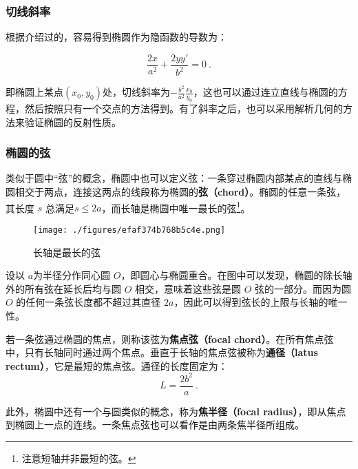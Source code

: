 \subsubsection{切线斜率}

根据介绍过的，容易得到椭圆作为隐函数的导数为：

\begin{equation}
\frac{2x}{a^2} + \frac{2yy'}{b^2} = 0~.
\end{equation}

即椭圆上某点$(x_0,y_0)$处，切线斜率为$\displaystyle-\frac{b^2}{a^2}\frac{x_0}{y_0}$，这也可以通过连立直线与椭圆的方程，然后按照只有一个交点的方法得到。有了斜率之后，也可以采用解析几何的方法来验证椭圆的反射性质。

\subsubsection{椭圆的弦}

类似于圆中“弦”的概念，椭圆中也可以定义弦：一条穿过椭圆内部某点的直线与椭圆相交于两点，连接这两点的线段称为椭圆的\textbf{弦（chord）}。椭圆的任意一条弦，其长度 $s$ 总满足$s\leq2a$，而长轴是椭圆中唯一最长的弦\footnote{注意短轴并非最短的弦。}。
\begin{figure}[ht]
\centering
\texttt{[image: ./figures/efaf374b768b5c4e.png]}
\caption{长轴是最长的弦} \label{fig_Elips3_4}
\end{figure}
设以 $a$为半径分作同心圆 $O$，即圆心与椭圆重合。在图中可以发现，椭圆的除长轴外的所有弦在延长后均与圆 $O$ 相交，意味着这些弦是圆 $O$ 弦的一部分。而因为圆 $O$ 的任何一条弦长度都不超过其直径 $2a$，因此可以得到弦长的上限与长轴的唯一性。

若一条弦通过椭圆的焦点，则称该弦为\textbf{焦点弦（focal chord）}。在所有焦点弦中，只有长轴同时通过两个焦点。垂直于长轴的焦点弦被称为\textbf{通径（latus rectum）}，它是最短的焦点弦。通径的长度固定为：
\begin{equation}
L = \frac{2b^2}{a}~.
\end{equation}

此外，椭圆中还有一个与圆类似的概念，称为\textbf{焦半径（focal radius）}，即从焦点到椭圆上一点的连线。一条焦点弦也可以看作是由两条焦半径所组成。

